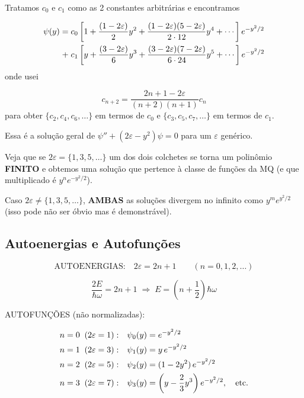 Tratamos $c_0$ e $c_1$ como as 2 constantes arbitrárias e encontramos

\begin{align}
    \psi(y) = \; &c_0\left[ 1 + \frac{(1-2\varepsilon)}{2}y^2 + \frac{(1-2\varepsilon)(5-2\varepsilon)}{2\cdot 12}y^4 + \cdots \right]e^{-y^2/2} \notag \\
    + \; &c_1\left[ y + \frac{(3-2\varepsilon)}{6}y^3 + \frac{(3-2\varepsilon)(7-2\varepsilon)}{6\cdot 24}y^5 + \cdots \right]e^{-y^2/2}
\label{eq:aula16_solucao_serie}
\end{align}
onde usei

\begin{equation}
    \boxed{c_{n+2} = \frac{2n+1-2\varepsilon}{(n+2)(n+1)}c_n}
\label{eq:aula16_relacao_recorrencia}
\end{equation}
para obter $\{c_2, c_4, c_6, \dots\}$ em termos de $c_0$ e $\{c_3, c_5, c_7, \dots\}$ em termos de $c_1$.

Essa é a solução geral de $\psi'' + (2\varepsilon - y^2)\psi = 0$ para um $\varepsilon$ genérico.

Veja que se $2\varepsilon = \{1,3,5,\dots\}$ um dos dois colchetes se torna um polinômio \textbf{FINITO} e obtemos uma solução que pertence à classe de funções da MQ (e que multiplicado é $y^n e^{-y^2/2}$).

Caso $2\varepsilon \neq \{1,3,5,\dots\}$, \textbf{AMBAS} as soluções divergem no infinito como $y^m e^{y^2/2}$ (isso pode não ser óbvio mas é demonstrável).

\subsection*{Autoenergias e Autofunções}

\begin{equation}
    \text{AUTOENERGIAS:} \quad 2\varepsilon = 2n+1 \qquad (n=0,1,2,\dots)
\label{eq:aula16_autoenergias_condicao}
\end{equation}

\begin{equation}
    \frac{2E}{\hbar\omega} = 2n+1 \;\Longrightarrow\; \boxed{E = \left(n+\frac{1}{2}\right)\hbar\omega}
\label{eq:aula16_autoenergias_final}
\end{equation}

AUTOFUNÇÕES (não normalizadas):

\begin{align}
    n=0 \;\; (2\varepsilon=1): \quad &\psi_0(y) = e^{-y^2/2} \notag \\
    n=1 \;\; (2\varepsilon=3): \quad &\psi_1(y) = y\,e^{-y^2/2} \notag \\
    n=2 \;\; (2\varepsilon=5): \quad &\psi_2(y) = (1-2y^2)\,e^{-y^2/2} \notag \\
    n=3 \;\; (2\varepsilon=7): \quad &\psi_3(y) = \left(y - \frac{2}{3}y^3\right)e^{-y^2/2}, \quad \text{etc.}
\label{eq:aula16_autofuncoes_lista}
\end{align}

